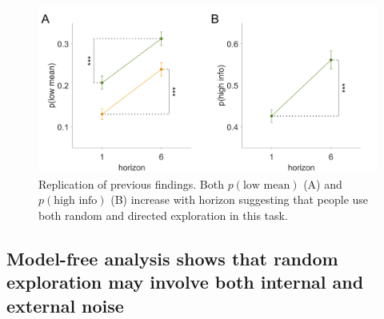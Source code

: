 \documentclass[12pt]{article}
\begin{document}
	\begin{figure}[H]
		\begin{center}
			\includegraphics[width=\textwidth]{figures/line_modelfree.png}
			\caption{
			Replication of previous findings. Both  $p(\mbox{low mean})$ (A) and $p(\mbox{high info})$ (B) increase with horizon suggesting that people use both random and directed exploration in this task.  }%
			\label{fig:modelfree}
		\end{center}
	\end{figure}
	
	
	\subsection*{Model-free analysis shows that random exploration may involve both internal and external noise}
	
	
\end{document}
